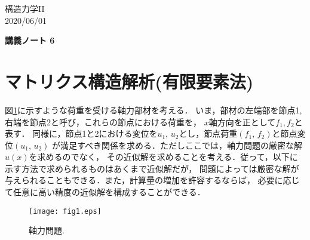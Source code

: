 \documentclass[10pt,a4j]{jarticle}
\newlength{\minitwocolumn}
\begin{document}
\newcommand{\fat}[1]{\mbox{\boldmath $#1$}}
\newcommand{\D}{\partial}
\newcommand{\w}{\omega}
\newcommand{\ga}{\alpha}
\newcommand{\gb}{\beta}
\newcommand{\gx}{\xi}
\newcommand{\gz}{\zeta}
\newcommand{\vhat}[1]{\hat{\fat{#1}}}
\newcommand{\spc}{\vspace{0.7\baselineskip}}
\newcommand{\halfspc}{\vspace{0.3\baselineskip}}

\newcommand{\twofig}[2]
 {
   \begin{figure}
     \begin{minipage}[t]{\minitwocolumn}
         \begin{center}   #1
         \end{center}
     \end{minipage}
         \hspace{\columnsep}
     \begin{minipage}[t]{\minitwocolumn}
         \begin{center} #2
         \end{center}
     \end{minipage}
   \end{figure}
 }
\begin{flushright}
	構造力学II\\
	2020/06/01
\end{flushright}
\begin{center}
	{\LARGE  \bf 講義ノート 6} \\
\end{center}
\section{マトリクス構造解析(有限要素法)}
図\ref{fig:fig1}に示すような荷重を受ける軸力部材を考える．
いま，部材の左端部を節点1, 右端を節点2と呼び，これらの節点における荷重を，
$x$軸方向を正として$f_1,f_2$と表す．
同様に，節点1と2における変位を$u_1,\,u_2$とし，節点荷重$(f_1,\, f_2)$と節点変位$(u_1,\, u_2)$
が満足すべき関係を求める．ただしここでは，軸力問題の厳密な解$u(x)$を求めるのでなく，
その近似解を求めることを考える．従って，以下に示す方法で求められるものはあくまで近似解だが，
問題によっては厳密な解が与えられることもできる．また，計算量の増加を許容するならば，
必要に応じて任意に高い精度の近似解を構成することができる．
\begin{figure}[b]
	\begin{center}
	\texttt{[image: fig1.eps]} 
	\end{center}
	\caption{軸力問題.} 
	\label{fig:fig1}
\end{figure}
\end{document}
